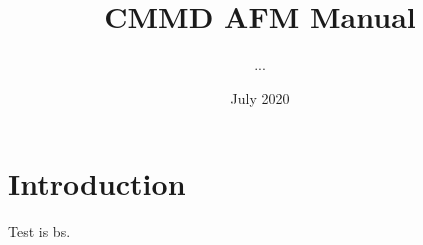 \documentclass{article}
\title{CMMD AFM Manual}
\author{...}
\date{July 2020}
\begin{document}
\maketitle

\section{Introduction}
Test is bs.	
\end{document}
